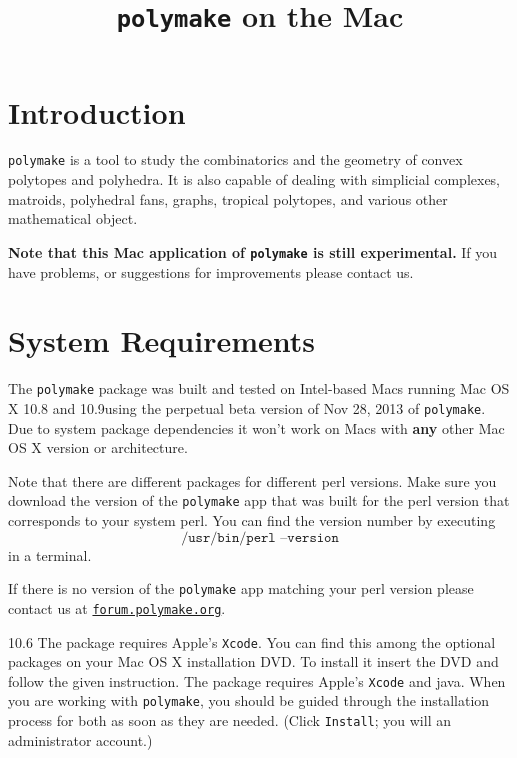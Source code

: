 \documentclass[a4paper]{amsart}
\title{\texttt{polymake} on the Mac\\\polymakeversion}
\newcommand{\macversion}{10.9}
\newcommand{\polymakeversion}{ perpetual beta version of Nov 28, 2013\xspace}
\newcommand{\macsix}{10.6}
\newcommand{\polymake}{\texttt{polymake}\xspace}
\begin{document}
\maketitle
\parindent0pt

\section*{Introduction}

\polymake is a tool to study the combinatorics and the geometry of
convex polytopes and polyhedra. It is also capable of dealing with
simplicial complexes, matroids, polyhedral fans, graphs, tropical polytopes, and various other mathematical object.

\textbf{Note that this Mac application of \polymake is still
  experimental.} If you have problems, or suggestions for improvements
please contact us.

\section*{System Requirements}

The \polymake package was built and tested on Intel-based Macs
running Mac OS X 10.8 and \macversion using the \polymakeversion of
\polymake. Due to system package dependencies it won't work on Macs
with \textbf{any} other Mac OS X version or architecture.

Note that there are different packages for different perl versions. Make sure you download the version of the \polymake app that was built for the perl version that corresponds to your system perl. You can find the version number by executing
\[\texttt{/usr/bin/perl --version}\] in a terminal.

If there is no version of the \polymake app matching your perl version please contact us at \href{http://forum.polymake.org}{\tt forum.polymake.org}.

\bigskip
\ifx\macversion\macsix%
The package requires Apple's \texttt{Xcode}.  You can find this among
the optional packages on your Mac OS X installation DVD. To install it
insert the DVD and follow the given instruction.%
\else%
The package requires Apple's \texttt{Xcode} and java. When you are working with \polymake, you should be guided through the installation process for both as soon as they are needed. (Click \texttt{Install}; you will an administrator account.)%
%
\fi%
\end{document}
